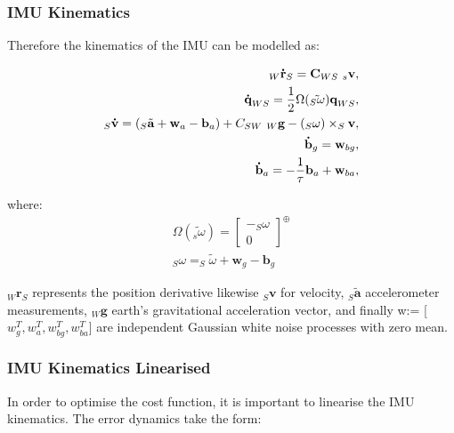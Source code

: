 \documentclass[11pt,twoside]{report}
\begin{document}
\subsubsection{IMU Kinematics}

Therefore the kinematics of the IMU can be modelled as:

\begin{equation}
\begin{aligned}
\label{imu_kin}
_{W} \textbf{\.{r}}_{S} = \textbf{C}_{WS} \textnormal{ } _{s}\textbf{v}, \\
\textbf{\.{q}}_{WS} = \frac{1}{2} \Omega(\tilde{_{S}\textbf{$\omega$}})\textbf{q}_{WS}, \\
_{S}\textbf{\.{v}}= (_{S}\tilde{\textbf{a}} + \textbf{w}_{a} - \textbf{b}_{a}) + C_{SW} \textnormal{ } _{W}\textbf{g} - (_{S}\textbf{$\omega$}) \times _{S}\textbf{v}, \\
\textbf{\.{b}}_{g} = \textbf{w}_{bg}, \\
\textbf{\.{b}}_{a} = -\frac{1}{\tau}\textbf{b}_{a} + \textbf{w}_{ba}, \\
\end{aligned}
\end{equation}

where:
\begin{equation}
\begin{aligned}
\Omega(\tilde{_{s}\textbf{$\omega$}}) = \begin{bmatrix}
-_{S}\textbf{$\omega$}  \\[0.3em]
0
\end{bmatrix} ^{\oplus} \\
_{S}\textbf{$\omega$} =  _{S}\tilde{\textbf{$\omega$}} + \textbf{w}_{g} - \textbf{b}_{g}
\end{aligned}
\end{equation}

$_{W} \textbf{\.{r}}_{S}$ represents the position derivative likewise $_{S}\textbf{\.{v}}$ for velocity,  $_{S}\tilde{\textbf{a}}$ accelerometer measurements, $_{W}\textbf{g}$ earth's gravitational acceleration vector, and finally w:= [$w_{g}^{T},w_{a}^{T},w_{bg}^{T},w_{ba}^{T}$] are independent Gaussian white noise processes with zero mean.

\subsubsection{IMU Kinematics Linearised}

In order to optimise the cost function, it is important to linearise the IMU kinematics. The error dynamics take the form:
\end{document}
